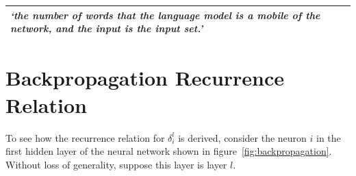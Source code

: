 \documentclass[a4paper, 12pt]{report}
\newcommand{\tit}[1]{\textit{#1}}
\begin{document}
\begin{center}
\begin{tabular}{C{15cm}}
	\hline
	\tit{`the number of words that the language model is a mobile of the network, and the input is the input set.'} \\ \hline
\end{tabular}
\end{center}





\appendix

\chapter{Backpropagation Recurrence Relation} \label{appendix:bp_recurrence}

To see how the recurrence relation for $\delta_i^l$ is derived, consider the neuron $i$ in the first hidden layer of the neural network shown in figure~\ref{fig:backpropagation}. Without loss of generality, suppose this layer is layer $l$. \\
\end{document}
